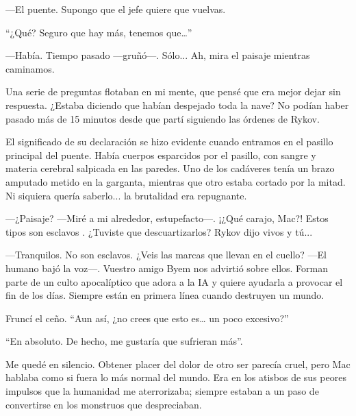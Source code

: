 —El puente. Supongo que el jefe quiere que vuelvas.

``¿Qué? Seguro que hay más, tenemos que…''


—Había. Tiempo pasado —gruñó—. Sólo... Ah, mira el paisaje mientras caminamos.

Una serie de preguntas flotaban en mi mente, que pensé que era mejor dejar sin respuesta. ¿Estaba diciendo que habían despejado toda la nave? No podían haber pasado más de 15 minutos desde que partí siguiendo las órdenes de Rykov.

El significado de su declaración se hizo evidente cuando entramos en el pasillo principal del puente. Había cuerpos esparcidos por el pasillo, con sangre y materia cerebral salpicada en las paredes. Uno de los cadáveres tenía un brazo amputado metido en la garganta, mientras que otro estaba cortado por la mitad. Ni siquiera quería saberlo... la brutalidad era repugnante.

—¿Paisaje? —Miré a mi alrededor, estupefacto—. ¡¿Qué carajo, Mac?! Estos tipos son esclavos . ¿Tuviste que descuartizarlos? Rykov dijo vivos y tú...

—Tranquilos. No son esclavos. ¿Veis las marcas que llevan en el cuello? —El humano bajó la voz—. Vuestro amigo Byem nos advirtió sobre ellos. Forman parte de un culto apocalíptico que adora a la IA y quiere ayudarla a provocar el fin de los días. Siempre están en primera línea cuando destruyen un mundo.

Fruncí el ceño. ``Aun así, ¿no crees que esto es… un poco excesivo?''


``En absoluto. De hecho, me gustaría que sufrieran más''.

Me quedé en silencio. Obtener placer del dolor de otro ser parecía cruel, pero Mac hablaba como si fuera lo más normal del mundo. Era en los atisbos de sus peores impulsos que la humanidad me aterrorizaba; siempre estaban a un paso de convertirse en los monstruos que despreciaban.